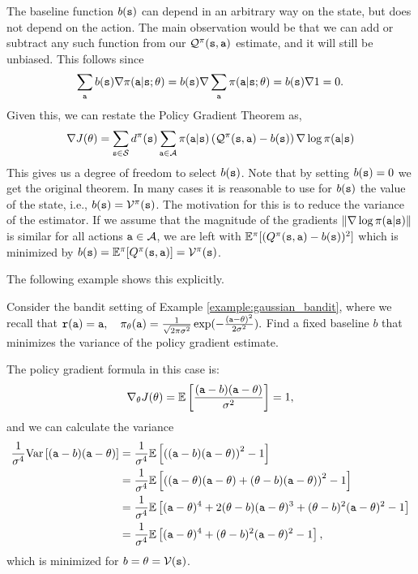 The baseline function $b({\tt s})$ can depend in an arbitrary way on
the state, but does not depend on the action. The main observation
would be that we can add or subtract any such function from our
$\mathcal{Q}^\pi
({\tt s},{\tt a})$ estimate, and it will still be unbiased. This follows since
\[
\sum_{\tt a} b({\tt s}) \nabla
\pi({\tt a}|{\tt s};\theta)=b({\tt s})\nabla \sum_{\tt a}
\pi({\tt a}|{\tt s};\theta)=b({\tt s})\nabla 1=0.
\]
Given this, we can restate the Policy Gradient Theorem as,
\[
\nabla J(\theta) = \sum_{{\tt s} \in \mathcal{S}} d^{\pi}({\tt s}) \sum_{{\tt a}\in
\mathcal{A}} \pi({\tt a}|{\tt s}) \left(\mathcal{Q}^\pi
({\tt s},{\tt a}) - b({\tt s})\right)\nabla \log \pi({\tt a}|{\tt s})
\]
This gives us a degree of freedom to select $b({\tt s})$. Note that
by setting $b({\tt s})=0$ we get the original theorem. In many cases
it is reasonable to use for $b({\tt s})$ the value of the state,
i.e., $b({\tt s})=\mathcal{V}^\pi({\tt s})$. The motivation for this is
to reduce the variance of the estimator. If we assume that the
magnitude of the gradients $\|\nabla
\log \pi({\tt a}|{\tt s})\|$ is similar for all actions
${\tt a}\in \mathcal{A}$, we are left with $\mathbb{E}^\pi
[(Q^\pi({\tt s},{\tt a})-b({\tt s}))^2]$ which is minimized by
$b({\tt s})=\mathbb{E}^\pi[Q^\pi({\tt s},{\tt a})]=\mathcal{V}^\pi({\tt s})$.

The following example shows this explicitly.
\begin{example}
    Consider the bandit setting of Example \ref{example:gaussian_bandit}, where we recall that
$        {\tt r}({\tt a}) = {\tt a}, \quad
        \pi_\theta({\tt a}) = \frac{1}{\sqrt{2 \pi \sigma^2}} \exp (- \frac{({\tt a} - \theta)^2}{2 \sigma^2}).$
Find a fixed baseline $b$ that minimizes the variance of the policy gradient estimate.

The policy gradient formula in this case is:
\begin{equation*}
        \nabla_\theta J(\theta) = \mathbb{E} \left[\frac{({\tt a}-b)({\tt a} - \theta)}{\sigma^2}\right] = 1, 
\end{equation*}
and we can calculate the variance
\begin{equation*}
\begin{split}
        \frac{1}{\sigma^4}\textrm{Var}\left[({\tt a}-b)({\tt a} - \theta)\right]  
        &=\frac{1}{\sigma^4}\mathbb{E}\left[\left(({\tt a}-b)({\tt a} - \theta)\right)^2 - 1\right] \\
        &=\frac{1}{\sigma^4}\mathbb{E}\left[\left(({\tt a}-\theta)({\tt a} - \theta) + (\theta-b)({\tt a} - \theta)\right)^2 - 1\right] \\
        &=\frac{1}{\sigma^4}\mathbb{E}\left[({\tt a}-\theta)^4 + 2(\theta-b)({\tt a} - \theta)^3 + (\theta-b)^2({\tt a} - \theta)^2 - 1\right] \\
        &=\frac{1}{\sigma^4}\mathbb{E}\left[({\tt a}-\theta)^4 + (\theta-b)^2({\tt a} - \theta)^2 - 1\right],
\end{split}
\end{equation*}
which is minimized for $b=\theta = \mathcal{V}({\tt s})$.
\end{example}



